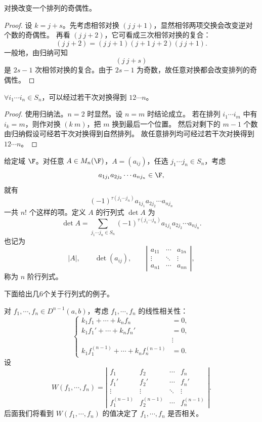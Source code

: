 \begin{lemma}\label{3.6.4}
	对换改变一个排列的奇偶性。
\end{lemma}

\begin{proof}
	设 $k=j+s$。先考虑相邻对换 $(j\ j+1)$，显然相邻两项交换会改变逆对个数的奇偶性。
	再看 $(j\ j+2)$，它可看成三次相邻对换的复合：
	\[
	(j\ j+2)=(j\ j+1)(j+1\ j+2)(j\ j+1).
	\]
	一般地，由归纳可知
	\[
	(j\ j+s)
	\]
	是 $2s-1$ 次相邻对换的复合。由于 $2s-1$ 为奇数，故任意对换都会改变排列的奇偶性。
\end{proof}

\begin{lemma}\label{3.6.5}
	$\forall i_1\cdots i_n\in S_n$，可以经过若干次对换得到 $12\cdots n$。
\end{lemma}

\begin{proof}
	使用归纳法。$n=2$ 时显然。设 $n=m$ 时结论成立。
	若在排列 $i_1\cdots i_m$ 中有 $i_k=m$，则作对换 $(k\ m)$，把 $m$ 换到最后一个位置。
	然后对剩下的 $m-1$ 个数由归纳假设可经若干次对换得到自然排列。
	故任意排列均可经过若干次对换得到 $12\cdots n$。
\end{proof}

\begin{definition}\label{3.6.6}
	给定域 $\F$。对任意 $A\in M_n(\F)$，$A=(a_{ij})$，任选 $j_1\cdots j_n\in S_n$，考虑
	\[
	a_{1j_1}a_{2j_2}\cdots a_{nj_n}\in\F,
	\]
	就有
	\[
	(-1)^{\tau(j_1\cdots j_n)}a_{1j_1}a_{2j_2}\cdots a_{nj_n}
	\]
	一共 $n!$ 个这样的项。定义 $A$ 的行列式 $\det A$ 为
	\[
	\det A=
	\sum_{j_1\cdots j_n\in S_n}
	(-1)^{\tau(j_1\cdots j_n)}a_{1j_1}a_{2j_2}\cdots a_{nj_n}.
	\]
	也记为
	\[
	|A|,
	\qquad
	\det(a_{ij}),
	\qquad
	\left|
	\begin{matrix}
		a_{11}&\cdots&a_{1n}\\
		\vdots&\ddots&\vdots\\
		a_{n1}&\cdots&a_{nn}
	\end{matrix}
	\right|,
	\]
	称为 $n$ 阶行列式。
\end{definition}

下面给出几6个关于行列式的例子。

\begin{example}
	对 $f_1,\cdots,f_n\in D^{n-1}(a,b)$，考虑 $f_1,\cdots,f_n$ 的线性相关性：
	\[
	\left\{
	\begin{aligned}
		k_1f_1+\cdots+k_nf_n&=0,\\
		k_1f_1'+\cdots+k_nf_n'&=0,\\
		&\vdots\\
		k_1f_1^{(n-1)}+\cdots+k_nf_n^{(n-1)}&=0.
	\end{aligned}
	\right.
	\]
	设
	\[
	W(f_1,\cdots,f_n)=
	\left|
	\begin{matrix}
		f_1&f_2&\cdots&f_n\\
		f_1'&f_2'&\cdots&f_n'\\
		\vdots&\vdots&\ddots&\vdots\\
		f_1^{(n-1)}&f_2^{(n-1)}&\cdots&f_n^{(n-1)}
	\end{matrix}
	\right|.
	\]
	后面我们将看到 $W(f_1,\cdots,f_n)$ 的值决定了 $f_1,\cdots,f_n$ 是否相关。
\end{example}


